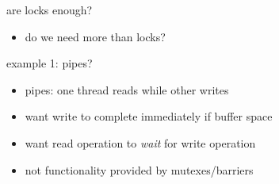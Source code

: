 \begin{frame}{are locks enough?}
\begin{itemize}
    \item do we need more than locks?
\end{itemize}
\end{frame}

\begin{frame}{example 1: pipes?}
\begin{itemize}
\item pipes: one thread reads while other writes
\vspace{.5cm}
\item want write to complete immediately if buffer space
\item want read operation to \textit{wait} for write operation
\vspace{.5cm}
\item not functionality provided by mutexes/barriers
\end{itemize}
\end{frame}
